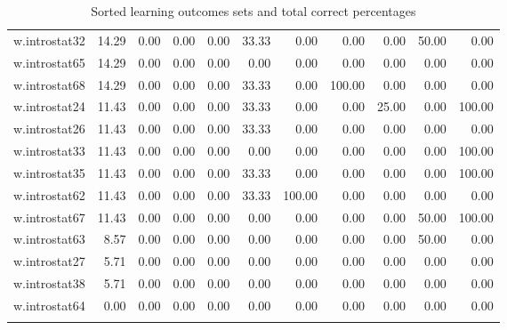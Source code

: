 \documentclass[12pt,english,nohyper]{tufte-handout}\usepackage[]{graphicx}\usepackage[]{color}
\begin{document}
\begin{longtable}{rrrrrrrrrrr}
  w.introstat32 & 14.29 & 0.00 & 0.00 & 0.00 & 33.33 & 0.00 & 0.00 & 0.00 & 50.00 & 0.00 \\ 
  w.introstat65 & 14.29 & 0.00 & 0.00 & 0.00 & 0.00 & 0.00 & 0.00 & 0.00 & 0.00 & 0.00 \\ 
  w.introstat68 & 14.29 & 0.00 & 0.00 & 0.00 & 33.33 & 0.00 & 100.00 & 0.00 & 0.00 & 0.00 \\ 
  w.introstat24 & 11.43 & 0.00 & 0.00 & 0.00 & 33.33 & 0.00 & 0.00 & 25.00 & 0.00 & 100.00 \\ 
  w.introstat26 & 11.43 & 0.00 & 0.00 & 0.00 & 33.33 & 0.00 & 0.00 & 0.00 & 0.00 & 0.00 \\ 
  w.introstat33 & 11.43 & 0.00 & 0.00 & 0.00 & 0.00 & 0.00 & 0.00 & 0.00 & 0.00 & 100.00 \\ 
  w.introstat35 & 11.43 & 0.00 & 0.00 & 0.00 & 33.33 & 0.00 & 0.00 & 0.00 & 0.00 & 100.00 \\ 
  w.introstat62 & 11.43 & 0.00 & 0.00 & 0.00 & 33.33 & 100.00 & 0.00 & 0.00 & 0.00 & 0.00 \\ 
  w.introstat67 & 11.43 & 0.00 & 0.00 & 0.00 & 0.00 & 0.00 & 0.00 & 0.00 & 50.00 & 100.00 \\ 
  w.introstat63 & 8.57 & 0.00 & 0.00 & 0.00 & 0.00 & 0.00 & 0.00 & 0.00 & 50.00 & 0.00 \\ 
  w.introstat27 & 5.71 & 0.00 & 0.00 & 0.00 & 0.00 & 0.00 & 0.00 & 0.00 & 0.00 & 0.00 \\ 
  w.introstat38 & 5.71 & 0.00 & 0.00 & 0.00 & 0.00 & 0.00 & 0.00 & 0.00 & 0.00 & 0.00 \\ 
  w.introstat64 & 0.00 & 0.00 & 0.00 & 0.00 & 0.00 & 0.00 & 0.00 & 0.00 & 0.00 & 0.00 \\ 
   \hline
\hline
\caption{Sorted learning outcomes sets and total correct percentages} 
\label{tab:LearningObj_data}
\end{longtable}
\end{document}
